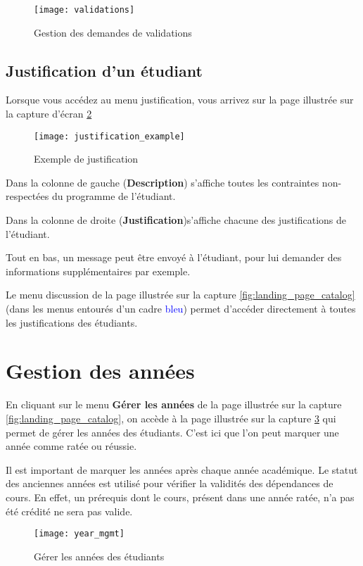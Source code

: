 \begin{figure}[htb]
\centering
\caption{Gestion des demandes de validations}
\label{fig:validations}
\texttt{[image: validations]}
\end{figure}
\subsection{Justification d'un étudiant}
Lorsque vous accédez au menu justification, vous arrivez sur la page illustrée sur la capture d'écran \ref{fig:justification_example}

\begin{figure}[htb]
\centering
\caption{Exemple de justification}
\label{fig:justification_example}
\texttt{[image: justification\_example]}
\end{figure}

Dans la colonne de gauche (\textbf{Description}) s'affiche toutes les contraintes non-respectées du programme de l'étudiant. 

Dans la colonne de droite (\textbf{Justification})s'affiche chacune des justifications de l'étudiant.

Tout en bas, un message peut être envoyé à l'étudiant, pour lui demander des informations supplémentaires par exemple. 

Le menu discussion de la page illustrée sur la capture \ref{fig:landing_page_catalog} (dans les menus entourés d'un cadre \textcolor{blue}{bleu}) permet d'accéder directement à toutes les justifications des étudiants.

\section{Gestion des années}

En cliquant sur le menu \textbf{Gérer les années} de la page illustrée sur la capture \ref{fig:landing_page_catalog}, on accède à la page illustrée sur la capture \ref{fig:manage_years} qui permet de gérer les années des étudiants. C'est ici que l'on peut marquer une année comme ratée ou réussie. 

Il est important de marquer les années après chaque année académique. Le statut des anciennes années est utilisé pour vérifier la validités des dépendances de cours. En effet, un prérequis dont le cours, présent dans une année ratée, n'a pas été crédité ne sera pas valide. 

\begin{figure}[htb]
\centering
\caption{Gérer les années des étudiants}
\label{fig:manage_years}
\texttt{[image: year\_mgmt]}
\end{figure}

